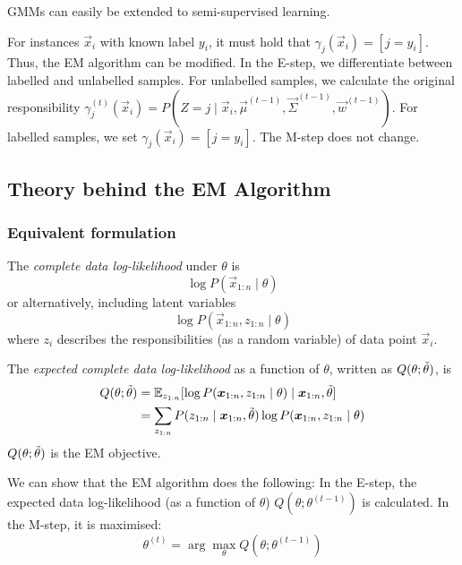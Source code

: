 GMMs can easily be extended to
semi-supervised learning.

For instances $\vec{x}_i$ with known
label $y_i$, it must hold that
$\gamma_j(\vec{x}_i) = [j = y_i]$.
Thus, the EM algorithm can be modified.
In the E-step, we differentiate between
labelled and unlabelled samples.
For unlabelled samples,
we calculate the original responsibility
$\gamma_j^{(t)}(\vec{x}_i) = P(Z = j \mid \vec{x}_i, \vec{\mu}^{(t - 1)}, \vec{\Sigma}^{(t - 1)}, \vec{w}^{(t - 1)})$.
For labelled samples, we set $\gamma_j(\vec{x}_i) = [j = y_i]$.
The M-step does not change.


\subsection{Theory behind the EM Algorithm}
\subsubsection{Equivalent formulation}
The \emph{complete data log-likelihood} under $\theta$ is
\begin{equation*}
\log{P(\vec{x}_{1:n} \mid \theta)}
\end{equation*}
or alternatively, including latent variables
\begin{equation*}
\log{P(\vec{x}_{1:n}, z_{1:n} \mid \theta)}
\end{equation*}
where $z_i$ describes the responsibilities
(as a random variable)
of data point $\vec{x}_i$.

The \emph{expected complete data log-likelihood}
as a function of $\theta$,
written as $Q(\theta; \Tilde{\theta})$, is
\begin{align*}
Q(\theta; \Tilde{\theta}) &=
\mathbb{E}_{z_{1:n}}[
\log{P(\boldsymbol{x}_{1:n}, z_{1:n} \mid \theta)} \mid \boldsymbol{x}_{1:n}, \Tilde{\theta}
] \\
&= \sum_{z_{1:n}}{
	P(z_{1:n} \mid \boldsymbol{x}_{1:n}, \Tilde{\theta}) \log{P(\boldsymbol{x}_{1:n}, z_{1:n} \mid \theta)}
}
\end{align*}
$Q(\theta; \Tilde{\theta})$ is the EM objective.

We can show that the EM algorithm does the following:
In the E-step, the expected data log-likelihood
(as a function of $\theta$) $Q(\theta; \theta^{(t-1)})$
is calculated.
In the M-step, it is maximised:
\begin{equation*}
\theta^{(t)} = \arg\max_\theta{Q(\theta; \theta^{(t-1)})}
\end{equation*}

